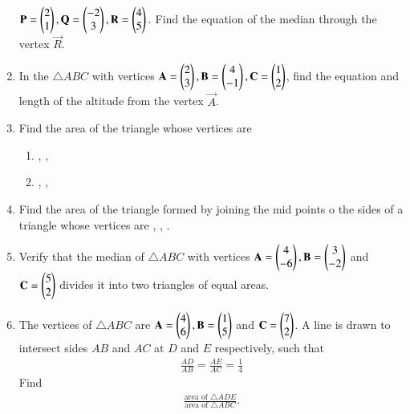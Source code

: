 \begin{enumerate}[label=\arabic*.,ref=\thesubsection.\theenumi]
$
\mathbf{P} = \begin{pmatrix}2 \\1\end{pmatrix},
\mathbf{Q} = \begin{pmatrix}-2\\3\end{pmatrix},
\mathbf{R} = \begin{pmatrix}4\\5\end{pmatrix}.
$
Find the equation of the median through the vertex $\vec{R}$.
\item In the $\triangle ABC$ with vertices
$
\mathbf{A}=\begin{pmatrix}2\\3\end{pmatrix}, 
\mathbf{B}=\begin{pmatrix}4\\-1\end{pmatrix},
 \mathbf{C}=\begin{pmatrix}1\\2\end{pmatrix}
$,
find the equation and length of the altitude from the vertex $\vec{A}$.
\item Find the area of the triangle whose vertices are
\begin{enumerate}
\item {}, ,  
\item  {},  ,  
\end{enumerate}
\item Find the area of the triangle formed by joining the mid points o the sides of a triangle whose vertices are  ,  ,  .
\item Verify that the median of $\triangle ABC$ with vertices $\mathbf{A}=\begin{pmatrix}4\\-6\end{pmatrix},  \mathbf{B}=\begin{pmatrix}3\\-2\end{pmatrix}$ and  $\mathbf{C} =  \begin{pmatrix}5\\2\end{pmatrix}$ divides it into two triangles of equal areas.
\item The vertices of $\triangle ABC$ are $\mathbf{A}=\begin{pmatrix}4\\6\end{pmatrix},  \mathbf{B}=\begin{pmatrix}1\\5\end{pmatrix}$ and  $\mathbf{C} =  \begin{pmatrix}7\\2\end{pmatrix}$.  A line is drawn to intersect sides $AB$ and $AC$ at $D$ and $E$ respectively, such that
\begin{align}
\frac{AD}{AB}=\frac{AE}{AC}= \frac{1}{4}
\end{align}
%
Find 
\begin{align}
\frac{\text{area of }\triangle ADE}{\text{area of }\triangle ABC}.
\end{align}

\end{enumerate}
